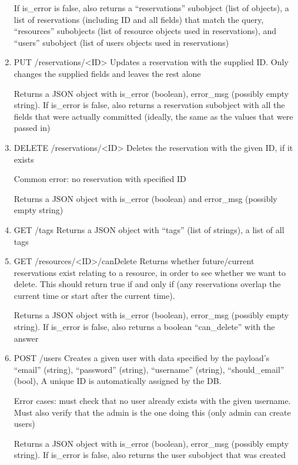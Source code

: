 \documentclass[12pt]{article}
\begin{document}
\begin{enumerate}
If is\_error is false, also returns a ``reservations'' subobject (list of objects), a list of reservations (including ID and all fields) that match the query, ``resources'' subobjects (list of resource objects used in reservations), and ``users'' subobject (list of users objects used in reservations)

\item PUT /reservations/<ID>
Updates a reservation with the supplied ID. Only changes the supplied fields and leaves the rest alone

Returns a JSON object with is\_error (boolean), error\_msg (possibly empty string). If is\_error is false, also returns a reservation subobject with all the fields that were actually committed (ideally, the same as the values that were passed in)

\item DELETE /reservations/<ID>
Deletes the reservation with the given ID, if it exists

Common error: no reservation with specified ID

Returns a JSON object with is\_error (boolean) and error\_msg (possibly empty string)


\item GET /tags
Returns a JSON object with ``tags'' (list of strings), a list of all tags

\item GET /resources/<ID>/canDelete
Returns whether future/current reservations exist relating to a resource, in order to see whether we want to delete. This should return true if and only if (any reservations overlap the current time or start after the current time).

Returns a JSON object with is\_error (boolean), error\_msg (possibly empty string). If is\_error is false, also returns a boolean ``can\_delete'' with the answer

\item POST /users
Creates a given user with data specified by the payload's ``email'' (string), ``password'' (string), ``username'' (string), ``should\_email'' (bool), A unique ID is automatically assigned by the DB. 

Error cases: must check that no user already exists with the given username. Must also verify that the admin is the one doing this (only admin can create users)

Returns a JSON object with is\_error (boolean), error\_msg (possibly empty string). If is\_error is false, also returns the user subobject that was created


\end{enumerate}
\end{document}
